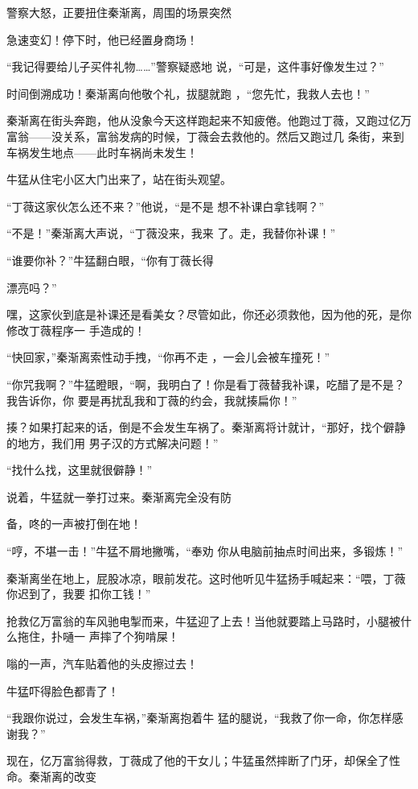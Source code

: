 \documentclass{article}
\begin{document}
警察大怒，正要扭住秦渐离，周围的场景突然

\newpage
急速变幻！停下时，他已经置身商场！ 

“我记得要给儿子买件礼物……”警察疑惑地
说，“可是，这件事好像发生过？” 

时间倒溯成功！秦渐离向他敬个礼，拔腿就跑
，“您先忙，我救人去也！” 

秦渐离在街头奔跑，他从没象今天这样跑起来不知疲倦。他跑过丁薇，又跑过亿万富翁——没关系，富翁发病的时候，丁薇会去救他的。然后又跑过几
条街，来到车祸发生地点——此时车祸尚未发生！ 

牛猛从住宅小区大门出来了，站在街头观望。

“丁薇这家伙怎么还不来？”他说，“是不是
想不补课白拿钱啊？” 

“不是！”秦渐离大声说，“丁薇没来，我来
了。走，我替你补课！” 

“谁要你补？”牛猛翻白眼，“你有丁薇长得
\newpage

漂亮吗？” 

嘿，这家伙到底是补课还是看美女？尽管如此，你还必须救他，因为他的死，是你修改丁薇程序一
手造成的！ 

“快回家，”秦渐离索性动手拽，“你再不走
，一会儿会被车撞死！” 

“你咒我啊？”牛猛瞪眼，“啊，我明白了！你是看丁薇替我补课，吃醋了是不是？我告诉你，你
要是再扰乱我和丁薇的约会，我就揍扁你！” 

揍？如果打起来的话，倒是不会发生车祸了。秦渐离将计就计，“那好，找个僻静的地方，我们用
男子汉的方式解决问题！” 


“找什么找，这里就很僻静！” 

说着，牛猛就一拳打过来。秦渐离完全没有防

\newpage
备，咚的一声被打倒在地！ 

“哼，不堪一击！”牛猛不屑地撇嘴，“奉劝
你从电脑前抽点时间出来，多锻炼！” 

秦渐离坐在地上，屁股冰凉，眼前发花。这时他听见牛猛扬手喊起来：“喂，丁薇你迟到了，我要
扣你工钱！” 

抢救亿万富翁的车风驰电掣而来，牛猛迎了上去！当他就要踏上马路时，小腿被什么拖住，扑嗵一
声摔了个狗啃屎！ 


嗡的一声，汽车贴着他的头皮擦过去！ 


牛猛吓得脸色都青了！ 

“我跟你说过，会发生车祸，”秦渐离抱着牛
猛的腿说，“我救了你一命，你怎样感谢我？” 

现在，亿万富翁得救，丁薇成了他的干女儿；牛猛虽然摔断了门牙，却保全了性命。秦渐离的改变
\newpage
\end{document}
